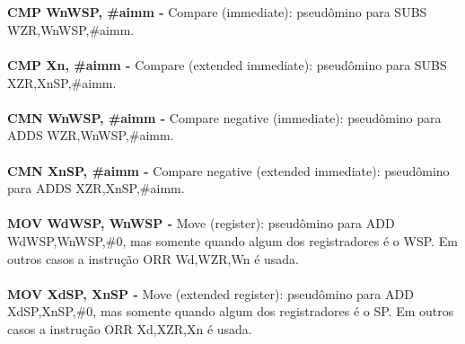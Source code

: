 \documentclass[12pt,a4paper,utf8]{ppgsi}
\begin{document}
\\\\\textbf{CMP Wn\textbar WSP, \#aimm -} Compare (immediate): pseudômino para SUBS WZR,Wn\textbar WSP,\#aimm.
\\\\\textbf{CMP Xn\textbarSP, \#aimm -} Compare (extended immediate): pseudômino para SUBS XZR,Xn\textbar SP,\#aimm.
\\\\\textbf{CMN Wn\textbar WSP, \#aimm -} Compare negative (immediate): pseudômino para ADDS WZR,Wn\textbar WSP,\#aimm. 
\\\\\textbf{CMN Xn\textbar SP, \#aimm -} Compare negative (extended immediate): pseudômino para ADDS XZR,Xn\textbar SP,\#aimm. 
\\\\\textbf{MOV Wd\textbar WSP, Wn\textbar WSP -} Move (register): pseudômino para ADD Wd\textbar WSP,Wn\textbar WSP,\#0, mas somente quando algum dos registradores é o WSP. Em outros casos a instrução ORR Wd,WZR,Wn é usada.
\\\\\textbf{MOV Xd\textbar SP, Xn\textbar SP -} Move (extended register): pseudômino para ADD Xd\textbar SP,Xn\textbar SP,\#0, mas somente quando algum dos registradores é o SP. Em outros casos a instrução ORR Xd,XZR,Xn é usada.
\end{document}
